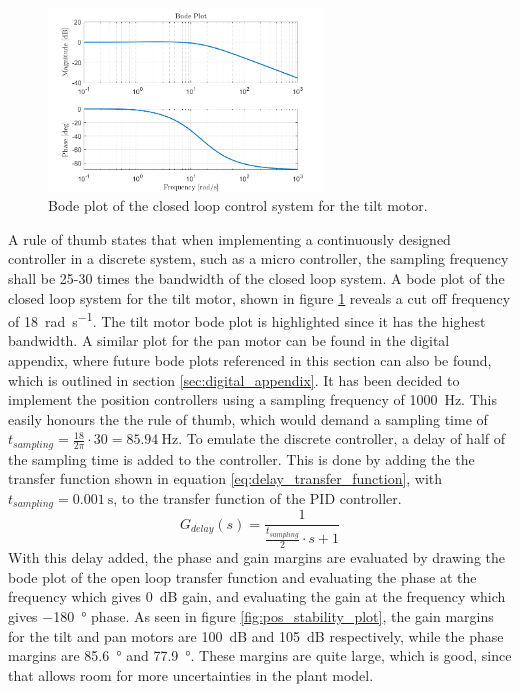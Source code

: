 \documentclass[../../main.tex]{subfiles}
\begin{document}
\begin{figure}[h]
    \centering
    \includegraphics[width=0.65\textwidth]{Sections/System_Design/Images/Bode_TiltMotorPos.png}
    \caption{Bode plot of the closed loop control system for the tilt motor.}
    \label{fig:pos_bode_plot}
\end{figure}

A rule of thumb states that when implementing a continuously designed controller in a discrete system, such as a micro controller, the sampling frequency shall be 25-30 times the bandwidth of the closed loop system. A bode plot of the closed loop system for the tilt motor, shown in figure \ref{fig:pos_bode_plot} reveals a cut off frequency of \SI{18}{\radian \per \second}. The tilt motor bode plot is highlighted since it has the highest bandwidth. A similar plot for the pan motor can be found in the digital appendix, where future bode plots referenced in this section can also be found, which is outlined in section \ref{sec:digital_appendix}. It has been decided to implement the position controllers using a sampling frequency of \SI{1000}{\hertz}. This easily honours the the rule of thumb, which would demand a sampling time of $t_{sampling} = \frac{18}{2\pi}\cdot 30 = \SI{85.94}{\hertz}$.
To emulate the discrete controller, a delay of half of the sampling time is added to the controller. This is done by adding the the transfer function shown in equation \ref{eq:delay_transfer_function}, with $t_{sampling} = \SI{0.001}{\second}$, to the transfer function of the PID controller. 
\begin{equation}\label{eq:delay_transfer_function}
    G_{delay}(s) = \frac{1}{\frac{t_{sampling}}{2}\cdot s+1}
\end{equation}
With this delay added, the phase and gain margins are evaluated by drawing the bode plot of the open loop transfer function and evaluating the phase at the frequency which gives  \SI{0}{\deci \bel} gain, and evaluating the gain at the frequency which gives \SI{-180}{\degree} phase. As seen in figure \ref{fig:pos_stability_plot}, the gain margins for the tilt and pan motors are \SI{100}{\deci \bel} and \SI{105}{\deci \bel} respectively, while the phase margins are \SI{85.6}{\degree} and \SI{77.9}{\degree}. These margins are quite large, which is good, since that allows room for more uncertainties in the plant model.
\end{document}
